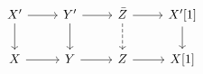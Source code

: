 \documentclass[12pt]{standalone}
\begin{document}
        $$

\begin{tikzcd}
    X^\prime \ar[r] \ar[d] & Y^\prime \ar[r] \ar[d] & \bar{Z} \ar[r] \ar[d,dashed] 
    & X^\prime[1] \ar[d] \\
    X \ar[r] & Y \ar[r] & Z \ar[r] & X[1]
\end{tikzcd}
        $$
        
\end{document}
